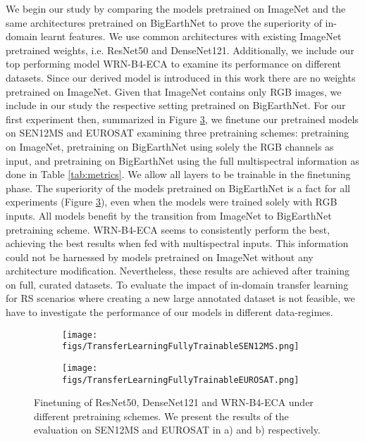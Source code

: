 \documentclass[journal]{IEEEtran}
\begin{document}
We begin our study by comparing the models pretrained on ImageNet and the same architectures pretrained on BigEarthNet to prove the superiority of in-domain learnt features. We use common architectures with existing ImageNet pretrained weights, i.e. ResNet50 and DenseNet121. Additionally, we include our top performing model WRN-B4-ECA to examine its performance on different datasets. Since our derived model is introduced in this work there are no weights pretrained on ImageNet. Given that ImageNet contains only RGB images, we include in our study the respective setting pretrained on BigEarthNet. For our first experiment then, summarized in Figure \ref{fig:finetuningsource}, we finetune our pretrained models on SEN12MS and EUROSAT examining three pretraining schemes: pretraining on ImageNet, pretraining on BigEarthNet using solely the RGB channels as input, and pretraining on BigEarthNet using the full multispectral information as done in Table \ref{tab:metrics}. We allow all layers to be trainable in the finetuning phase. The superiority of the models pretrained on BigEarthNet is a fact for all experiments (Figure \ref{fig:finetuningsource}), even when the models were trained solely with RGB inputs. All models benefit by the transition from ImageNet to BigEarthNet pretraining scheme.
WRN-B4-ECA seems to consistently perform the best, achieving the best results when fed with multispectral inputs. This information could not be harnessed by models pretrained on ImageNet without any architecture modification. Nevertheless, these results are achieved after training on full, curated datasets. To evaluate the impact of in-domain transfer learning for RS scenarios where creating a new large annotated dataset is not feasible, we have to investigate the performance of our models in different data-regimes.

\begin{figure}[!htp]
\begin{subfigure}{0.23\textwidth}

\centering
 \texttt{[image: figs/TransferLearningFullyTrainableSEN12MS.png]}
 \caption{}
 \label{fig:fullytrainablesen12ms}
 \end{subfigure}
 \begin{subfigure}{0.23\textwidth}
 \texttt{[image: figs/TransferLearningFullyTrainableEUROSAT.png]}
 \caption{}
 \label{fig:fullytrainableeurosat}
 \end{subfigure}
\caption{Finetuning of ResNet50, DenseNet121 and WRN-B4-ECA under different pretraining schemes. We present the results of the evaluation on SEN12MS and EUROSAT in a) and b) respectively.}
\label{fig:finetuningsource}
\end{figure}
\end{document}
